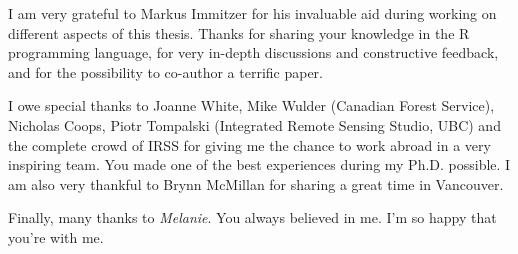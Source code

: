 I am very grateful to Markus Immitzer for his invaluable aid during working on different aspects of this thesis. 
Thanks for sharing your knowledge in the \textsf{R} programming language, 
for very in-depth discussions and constructive feedback, 
and for the possibility to co-author a terrific paper.    

I owe special thanks to Joanne White, Mike Wulder (Canadian Forest Service),
Nicholas Coops, Piotr Tompalski (Integrated Remote Sensing Studio, UBC) and the complete crowd of IRSS for giving me the chance to work abroad in a very inspiring team. 
You made one of the best experiences during my Ph.D. possible. 
I am also very thankful to Brynn McMillan for sharing a great time in Vancouver. 

\noindent Finally, many thanks to \emph{Melanie}. You always believed in me. I'm so happy that you're with me.

\endgroup



